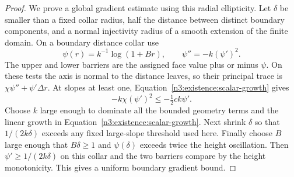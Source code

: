 \begin{proof}
We prove a global gradient estimate using this radial ellipticity.
Let $\delta$ be smaller than a fixed collar radius, half the distance
between distinct boundary components, and a normal injectivity
radius of a smooth extension of the finite domain.  On a boundary
distance collar use
\begin{equation}\label{n3:existence:logarithmic-modulus}
 \psi(r)=k^{-1}\log(1+Br),\qquad
 \psi''=-k(\psi')^2.
\end{equation}
The upper and lower barriers are the assigned face value plus or
minus $\psi$.  On these tests the axis is normal to the distance
leaves, so their principal trace is
$\chi\psi''+\psi'\Delta r$.  At slopes at least one,
Equation~\eqref{n3:existence:scalar-growth} gives
\begin{equation}\label{n3:existence:logarithmic-dominance}
 -k\chi(\psi')^2\le-\tfrac12ck\psi'.
\end{equation}
Choose $k$ large enough to dominate all the bounded geometry terms
and the linear growth in Equation~\eqref{n3:existence:scalar-growth}.
Next shrink $\delta$ so that $1/(2k\delta)$ exceeds any fixed
large-slope threshold used here.  Finally choose $B$ large enough
that $B\delta\ge1$ and $\psi(\delta)$ exceeds twice the height
oscillation.  Then $\psi'\ge1/(2k\delta)$ on this collar and
the two barriers compare by the height monotonicity.  This gives
a uniform boundary gradient bound.


\end{proof}
